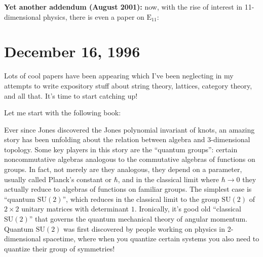 \documentclass{article}
\def\tightlist{}
\renewcommand{\texttt}[1]{%
  \begingroup
  \ttfamily
  \begingroup\lccode`~=`/\lowercase{\endgroup\def~}{/\discretionary{}{}{}}%
  \begingroup\lccode`~=`[\lowercase{\endgroup\def~}{[\discretionary{}{}{}}%
  \begingroup\lccode`~=`.\lowercase{\endgroup\def~}{.\discretionary{}{}{}}%
  \catcode`/=\active\catcode`[=\active\catcode`.=\active
  \scantokens{#1\noexpand}%
  \endgroup
}
\begin{document}
\textbf{Yet another addendum (August 2001):} now, with the rise of
interest in 11-dimensional physics, there is even a paper on
\(\mathrm{E}_{11}\):

\hypertarget{week96}{%
\section{December 16, 1996}\label{week96}}

Lots of cool papers have been appearing which I've been neglecting in my
attempts to write expository stuff about string theory, lattices,
category theory, and all that. It's time to start catching up!

Let me start with the following book:


Ever since Jones discovered the Jones polynomial invariant of knots, an
amazing story has been unfolding about the relation between algebra and
3-dimensional topology. Some key players in this story are the ``quantum
groups'': certain noncommutative algebras analogous to the commutative
algebras of functions on groups. In fact, not merely are they analogous,
they depend on a parameter, usually called Planck's constant or
\(\hbar\), and in the classical limit where \(\hbar\to0\) they actually
reduce to algebras of functions on familiar groups. The simplest case is
``quantum \(\mathrm{SU}(2)\)'', which reduces in the classical limit to
the group \(\mathrm{SU}(2)\) of \(2\times2\) unitary matrices with
determinant \(1\). Ironically, it's good old ``classical
\(\mathrm{SU}(2)\)'' that governs the quantum mechanical theory of
angular momentum. Quantum \(\mathrm{SU}(2)\) was first discovered by
people working on physics in 2-dimensional spacetime, where when you
quantize certain systems you also need to quantize their group of
symmetries!
\end{document}
